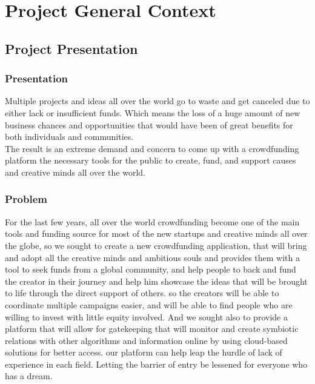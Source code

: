 

\setcounter{mtc}{7}
\chapter{Project General Context }%
\label{chap:chapter_one}
\minitoc
\section{ Project Presentation }
\subsection{Presentation}
Multiple projects and ideas all over the world go to waste and get canceled due to either lack or insufficient funds.
Which means the loss of a huge amount of new business chances and opportunities that would have been of great benefits for both individuals and communities.\\
The result is an extreme demand and concern to come up with a crowdfunding platform the necessary tools for the public to create, fund, and support causes and creative minds all over the world.



\subsection{Problem}
For the last few years, all over the world crowdfunding become one of the main tools and funding source for most of the new startups and creative minds all over the globe,
so we sought to create a new crowdfunding application, that will bring and adopt all the creative minds and ambitious souls and provides them with a tool to seek funds from a global community,
and help people to back and fund the creator in their journey and help him showcase the ideas that will be brought to life through the direct support of others.
so the creators will be able to coordinate multiple campaigns easier, and will be able to find people who are willing to invest with little equity involved.
And we sought also to provide a platform that will allow for gatekeeping that will monitor and create symbiotic relations with other algorithms and information online by using cloud-based solutions for better access.
our platform can help leap the hurdle of lack of experience in each field. Letting the barrier of entry be lessened for everyone who has a dream.\\


